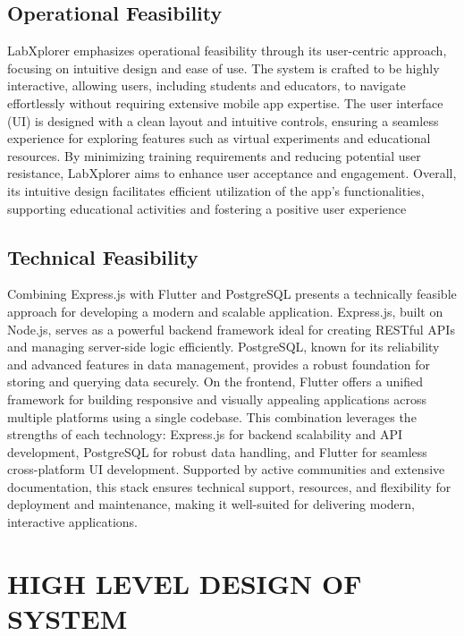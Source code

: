 \subsection{Operational Feasibility}
LabXplorer emphasizes operational feasibility through its user-centric approach, focusing on intuitive design and ease of use. The system is crafted to be highly interactive, allowing users, including students and educators, to navigate effortlessly without requiring extensive mobile app expertise. The user interface (UI) is designed with a clean layout and intuitive controls, ensuring a seamless experience for exploring features such as virtual experiments and educational resources. By minimizing training requirements and reducing potential user resistance, LabXplorer aims to enhance user acceptance and engagement. Overall, its intuitive design facilitates efficient utilization of the app's functionalities, supporting educational activities and fostering a positive user experience 
\subsection{Technical Feasibility}
Combining Express.js with Flutter and PostgreSQL presents a technically feasible approach for developing a modern and scalable application. Express.js, built on Node.js, serves as a powerful backend framework ideal for creating RESTful APIs and managing server-side logic efficiently. PostgreSQL, known for its reliability and advanced features in data management, provides a robust foundation for storing and querying data securely. On the frontend, Flutter offers a unified framework for building responsive and visually appealing applications across multiple platforms using a single codebase. This combination leverages the strengths of each technology: Express.js for backend scalability and API development, PostgreSQL for robust data handling, and Flutter for seamless cross-platform UI development. Supported by active communities and extensive documentation, this stack ensures technical support, resources, and flexibility for deployment and maintenance, making it well-suited for delivering modern, interactive applications.
\section{HIGH LEVEL DESIGN OF SYSTEM}
